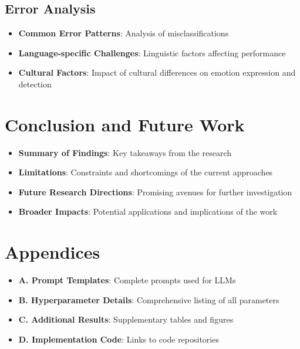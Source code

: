 \documentclass[a4paper,12pt]{extarticle}
\begin{document}
\subsection{Error Analysis}
\begin{itemize}
\item \textbf{Common Error Patterns}: Analysis of misclassifications
\item \textbf{Language-specific Challenges}: Linguistic factors affecting performance
\item \textbf{Cultural Factors}: Impact of cultural differences on emotion expression and detection
\end{itemize}

\section{Conclusion and Future Work}
\begin{itemize}
\item \textbf{Summary of Findings}: Key takeaways from the research
\item \textbf{Limitations}: Constraints and shortcomings of the current approaches
\item \textbf{Future Research Directions}: Promising avenues for further investigation
\item \textbf{Broader Impacts}: Potential applications and implications of the work
\end{itemize}

\printbibliography

\section*{Appendices}
\begin{itemize}
\item \textbf{A. Prompt Templates}: Complete prompts used for LLMs
\item \textbf{B. Hyperparameter Details}: Comprehensive listing of all parameters
\item \textbf{C. Additional Results}: Supplementary tables and figures
\item \textbf{D. Implementation Code}: Links to code repositories
\end{itemize}
\end{document}
